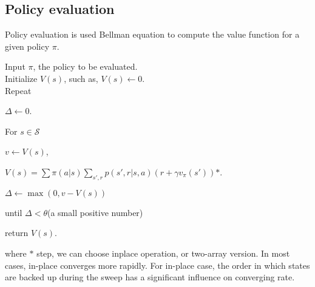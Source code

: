 \documentclass[11pt,a4paper]{article}
\def\S{{\mathcal S}}
\begin{document}
\subsection{Policy evaluation}
Policy evaluation is used Bellman equation to compute the value function for a given policy $\pi$.
\begin{tcolorbox}
Input $\pi$, the policy to be evaluated. \\
Initialize $V(s)$, such as, $V(s) \leftarrow 0$. \\ 
Repeat\par 
\hspace{1cm} $\Delta \leftarrow 0$. \par
\hspace{1cm} For $s \in \S$ \par
\hspace{2cm} $v \leftarrow V(s)$, \par
\hspace{2cm} $V(s) = \sum \pi(a|s)\sum_{s',r}p(s',r|s,a)(r+\gamma v_{\pi}(s')) \textbf{*}$.\par
\hspace{2cm} $\Delta \leftarrow \max(0,v-V(s))$\par
\hspace{1cm}
until $\Delta < \theta$(a small positive number)\par
return $V(s)$.
\end{tcolorbox}
where $*$ step, we can choose inplace operation, or two-array version. In most cases, in-place converges more rapidly. For in-place case, the order in which states are backed up during the sweep has a significant influence on converging rate.\par
\end{document}
